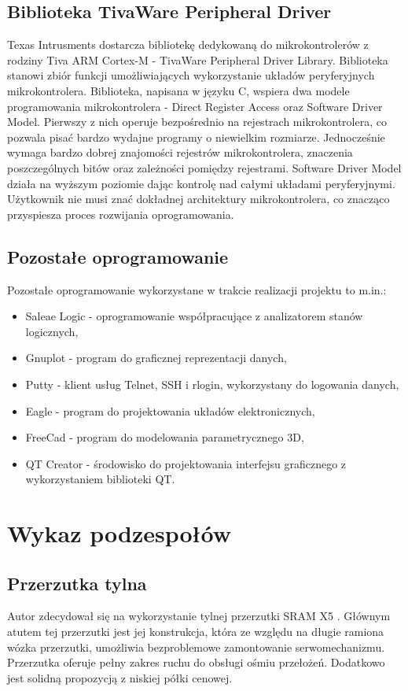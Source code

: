 \subsection{Biblioteka TivaWare Peripheral Driver}
Texas Intrusments dostarcza bibliotekę dedykowaną do mikrokontrolerów z rodziny Tiva ARM Cortex-M - TivaWare  Peripheral Driver Library. Biblioteka stanowi zbiór funkcji umożliwiających wykorzystanie układów peryferyjnych mikrokontrolera. Biblioteka, napisana w języku C, wspiera dwa modele programowania mikrokontrolera - Direct Register Access oraz Software Driver Model. Pierwszy z nich operuje bezpośrednio na rejestrach mikrokontrolera, co pozwala pisać bardzo wydajne programy o niewielkim rozmiarze. Jednocześnie wymaga bardzo dobrej znajomości rejestrów mikrokontrolera, znaczenia poszczególnych bitów oraz zależności pomiędzy rejestrami. Software Driver Model działa na wyższym poziomie dając kontrolę nad całymi układami peryferyjnymi. Użytkownik nie musi znać dokładnej architektury mikrokontrolera, co znacząco przyspiesza proces rozwijania oprogramowania. 
\subsection{Pozostałe oprogramowanie}
Pozostałe oprogramowanie wykorzystane w trakcie realizacji projektu to m.in.:
\begin{itemize}
\item
Saleae Logic - oprogramowanie współpracujące z analizatorem stanów logicznych,
\item
Gnuplot - program do graficznej reprezentacji danych,
\item
Putty - klient usług Telnet, SSH i rlogin, wykorzystany do logowania danych,
\item
Eagle - program do projektowania układów elektronicznych,
\item
FreeCad - program do modelowania parametrycznego 3D,
\item
QT Creator - środowisko do projektowania interfejsu graficznego z wykorzystaniem biblioteki QT.
\end{itemize}
\section{Wykaz podzespołów}
\subsection{Przerzutka tylna}
Autor zdecydował się na wykorzystanie tylnej przerzutki SRAM X5 \cite{sramX5}. Głównym atutem tej przerzutki jest jej konstrukcja, która ze względu na długie ramiona wózka przerzutki, umożliwia bezproblemowe zamontowanie serwomechanizmu. Przerzutka oferuje pełny zakres ruchu do obsługi ośmiu przełożeń. Dodatkowo jest solidną propozycją z niskiej półki cenowej.
